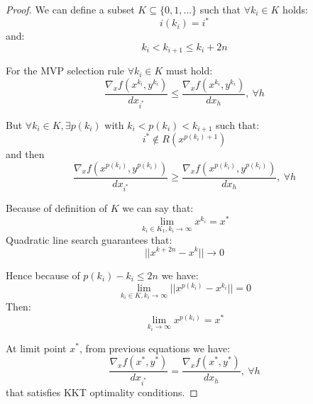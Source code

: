\begin{proof}
We can define a subset $K \subseteq \{0,1,\ldots\}$ such that $\forall k_i \in K$ holds:
\begin{equation}
 i(k_i)=i^*
\end{equation}
and:
\begin{equation}
 k_i <k_{i+1} \le k_i+2n
\end{equation}

For the MVP selection rule $\forall k_i \in K$ must hold:
\begin{equation}
 \frac{\nabla_xf(x^{k_i},y^{k_i})}{dx_{i^*}} \le \frac{\nabla_xf(x^{k_i},y^{k_i})}{dx_{h}}, \ \forall h
\end{equation}

But  $\forall k_i \in K,\exists p(k_i)$ with  $k_i <p(k_i)<k_{i+1}$ such that:
\begin{equation}
 i^* \not \in R(x^{p(k_i)+1})
\end{equation}
and then
\begin{equation}
 \frac{\nabla_xf(x^{p(k_i)},y^{p(k_i)})}{dx_{i^*}} \ge \frac{\nabla_xf(x^{p(k_i)},y^{p(k_i)})}{dx_{h}}, \ \forall h
\end{equation}




Because of  definition of $K$ we can say that:
\begin{equation}
 \lim_{k_i \in K_1, k_i \rightarrow \infty} x^{k_i} =x^*
\end{equation}
Quadratic line search guarantees that:
\begin{equation}
 ||x^{k+2n}-x^{k}|| \rightarrow 0
\end{equation}


Hence because of $p(k_i)-k_i \le 2n$ we have:
\begin{equation}
 \lim_{k_i \in K,k_i\rightarrow \infty}  ||x^{p(k_i)}-x^{k_i}||=0
\end{equation}
Then:
\begin{equation}
 \lim_{k_i\rightarrow \infty} x^{p(k_i)}=x^*
\end{equation}

At limit point $x^*$, from previous equations we have:
\begin{equation*}
 \frac{\nabla_xf(x^{*},y^{*})}{dx_{i^*}} = \frac{\nabla_xf(x^{*},y^{*})}{dx_{h}}, \ \forall h
\end{equation*}
that satisfies KKT optimality conditions.

\end{proof}